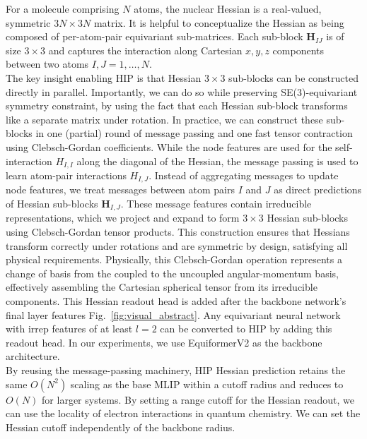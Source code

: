 \documentclass[pdflatex,sn-mathphys-num]{sn-jnl}%
\theoremstyle{thmstyleone}%
\theoremstyle{thmstyletwo}%
\theoremstyle{thmstylethree}%
\begin{document}
For a molecule comprising $N$ atoms, the nuclear Hessian is a real-valued, symmetric $3N \times 3N$ matrix.
It is helpful to conceptualize the Hessian as being composed of per-atom-pair equivariant sub-matrices.
Each sub-block $\mathbf{H}_{IJ}$ is of size $3 \times 3$ and captures the interaction along Cartesian $x,y,z$ components between two atoms $I,J=1,\dots,N$.\\
The key insight enabling HIP is that Hessian $3 \times 3$ sub-blocks can be constructed directly in parallel.
Importantly, we can do so while preserving SE(3)-equivariant symmetry constraint, by using the fact that each Hessian sub-block transforms like a separate matrix under rotation.
In practice, we can construct these sub-blocks in one (partial) round of message passing and one fast tensor contraction using Clebsch-Gordan coefficients. 
While the node features are used for the self-interaction $H_{I,I}$ along the diagonal of the Hessian, the message passing is used to learn atom-pair interactions $H_{I,J}$.
Instead of aggregating messages to update node features, we treat messages between atom pairs $I$ and $J$ as direct predictions of Hessian sub-blocks $\mathbf{H}_{I,J}$. 
These message features contain irreducible representations, which we project and expand to form $3\times3$ Hessian sub-blocks using Clebsch-Gordan tensor products. 
This construction ensures that Hessians transform correctly under rotations and are symmetric by design, satisfying all physical requirements.
Physically, this Clebsch-Gordan operation represents a change of basis from the coupled to the uncoupled angular-momentum basis, effectively assembling the Cartesian spherical tensor from its irreducible components.
This Hessian readout head is added after the backbone network's final layer features Fig.~\ref{fig:visual_abstract}. 
Any equivariant neural network with irrep features of at least $l=2$ can be converted to HIP by adding this readout head. 
In our experiments, we use EquiformerV2 \cite{liao2023equiformerv2} as the backbone architecture.\\
By reusing the message-passing machinery, HIP Hessian prediction retains the same $O(N^2)$ scaling as the base MLIP within a cutoff radius and reduces to $O(N)$ for larger systems. 
By setting a range cutoff for the Hessian readout, we can use the locality of electron interactions in quantum chemistry. 
We can set the Hessian cutoff independently of the backbone radius.
\end{document}
